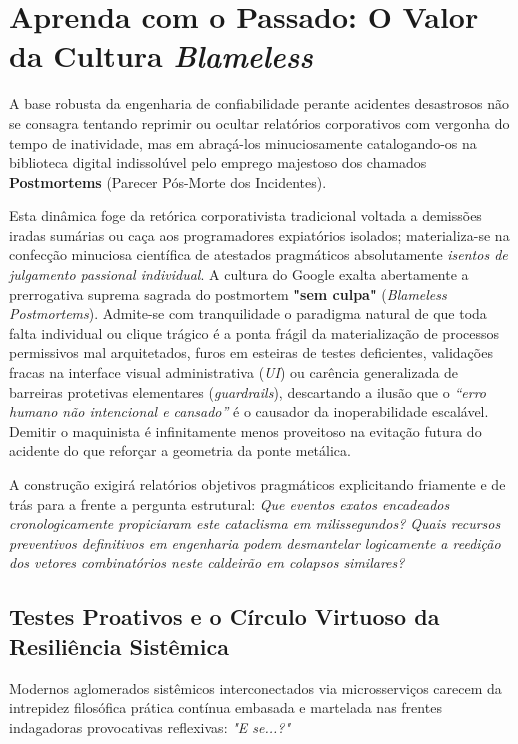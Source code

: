 \documentclass[12pt,a4paper,twoside]{report}
\begin{document}
\section{Aprenda com o Passado: O Valor da Cultura \textit{Blameless}}

A base robusta da engenharia de confiabilidade perante acidentes desastrosos não se consagra tentando reprimir ou ocultar relatórios corporativos com vergonha do tempo de inatividade, mas em abraçá-los minuciosamente catalogando-os na biblioteca digital indissolúvel pelo emprego majestoso dos chamados \textbf{Postmortems} (Parecer Pós-Morte dos Incidentes). 

Esta dinâmica foge da retórica corporativista tradicional voltada a demissões iradas sumárias ou caça aos programadores expiatórios isolados; materializa-se na confecção minuciosa científica de atestados pragmáticos absolutamente \textit{isentos de julgamento passional individual}. A cultura do Google exalta abertamente a prerrogativa suprema sagrada do postmortem \textbf{"sem culpa"} (\textit{Blameless Postmortems}). Admite-se com tranquilidade o paradigma natural de que toda falta individual ou clique trágico é a ponta frágil da materialização de processos permissivos mal arquitetados, furos em esteiras de testes deficientes, validações fracas na interface visual administrativa (\textit{UI}) ou carência generalizada de barreiras protetivas elementares (\textit{guardrails}), descartando a ilusão que o \textit{“erro humano não intencional e cansado”} é o causador da inoperabilidade escalável. Demitir o maquinista é infinitamente menos proveitoso na evitação futura do acidente do que reforçar a geometria da ponte metálica.

A construção exigirá relatórios objetivos pragmáticos explicitando friamente e de trás para a frente a pergunta estrutural: \textit{Que eventos exatos encadeados cronologicamente propiciaram este cataclisma em milissegundos? Quais recursos preventivos definitivos em engenharia podem desmantelar logicamente a reedição dos vetores combinatórios neste caldeirão em colapsos similares?}

\subsection{Testes Proativos e o Círculo Virtuoso da Resiliência Sistêmica}

Modernos aglomerados sistêmicos interconectados via microsserviços carecem da intrepidez filosófica prática contínua embasada e martelada nas frentes indagadoras provocativas reflexivas: \textit{"E se...?"}
\end{document}
